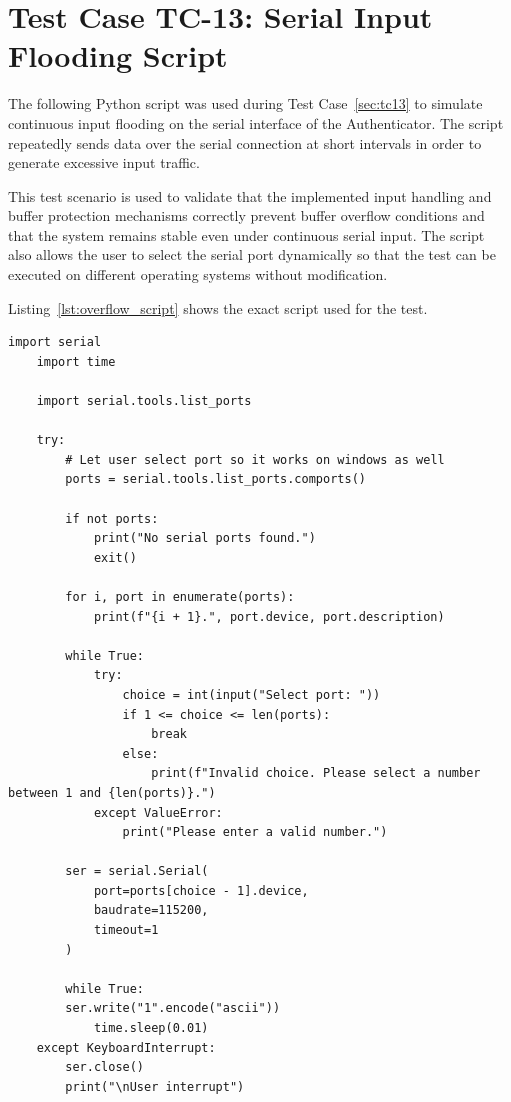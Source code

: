 \section{Test Case TC-13: Serial Input Flooding Script}
\label{app:overflow_script_section}

The following Python script was used during Test Case~\ref{sec:tc13} to simulate continuous input flooding on the serial interface of the Authenticator. The script repeatedly sends data over the serial connection at short intervals in order to generate excessive input traffic.

This test scenario is used to validate that the implemented input handling and buffer protection mechanisms correctly prevent buffer overflow conditions and that the system remains stable even under continuous serial input. The script also allows the user to select the serial port dynamically so that the test can be executed on different operating systems without modification.

Listing~\ref{lst:overflow_script} shows the exact script used for the test.

\begin{lstlisting}[style=python, caption={Python script used to generate continuous serial input during TC-11}, label={lst:overflow_script}]
    import serial
    import time

    import serial.tools.list_ports

    try:
        # Let user select port so it works on windows as well
        ports = serial.tools.list_ports.comports()

        if not ports:
            print("No serial ports found.")
            exit()

        for i, port in enumerate(ports):
            print(f"{i + 1}.", port.device, port.description)

        while True:
            try:
                choice = int(input("Select port: "))
                if 1 <= choice <= len(ports):
                    break
                else:
                    print(f"Invalid choice. Please select a number between 1 and {len(ports)}.")
            except ValueError:
                print("Please enter a valid number.")

        ser = serial.Serial(
            port=ports[choice - 1].device,
            baudrate=115200,
            timeout=1
        )
        
        while True:
        ser.write("1".encode("ascii"))
            time.sleep(0.01)
    except KeyboardInterrupt:
        ser.close()
        print("\nUser interrupt")
\end{lstlisting}
    